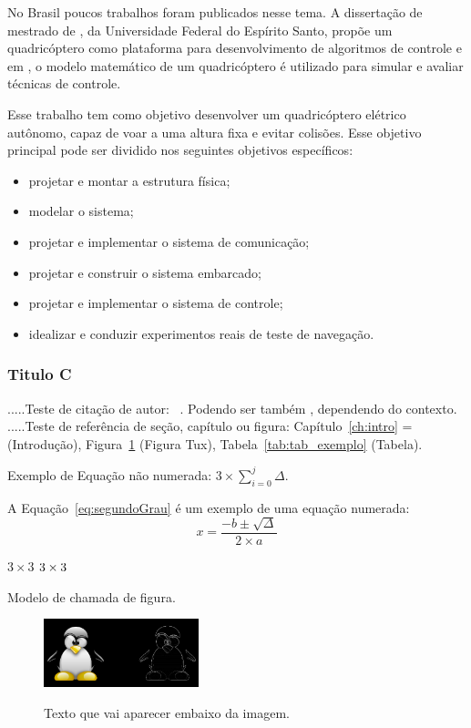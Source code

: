 No Brasil poucos trabalhos foram publicados nesse tema. A dissertação de mestrado de , da Universidade Federal do Espírito Santo, propõe um quadricóptero como plataforma para desenvolvimento de algoritmos de controle e em , o modelo matemático de um quadricóptero é utilizado para simular e avaliar técnicas de controle.

Esse trabalho tem como objetivo desenvolver um quadricóptero elétrico autônomo, capaz de voar a uma altura fixa e evitar colisões. Esse objetivo principal pode ser dividido nos seguintes objetivos específicos:

\begin{itemize}
\item projetar e montar a estrutura física;
\item modelar o sistema;
\item projetar e implementar o sistema de comunicação;
\item projetar e construir o sistema embarcado;
\item projetar e implementar o sistema de controle;
\item idealizar e conduzir experimentos reais de teste de navegação.
\end{itemize}



\subsubsection{Titulo C}\label{ssubsec:tituloc}

.....Teste de citaç\~ao de autor: ~\cite{AikesJunior2011}. Podendo ser também , dependendo do contexto.
.....Teste de referência de seç\~ao, cap\'itulo ou figura: Capítulo~\ref{ch:intro} = (Introduç\~ao), Figura~\ref{fig:tux_laplace} (Figura Tux), Tabela~\ref{tab:tab_exemplo} (Tabela).

Exemplo de Equação não numerada: $3 \times \sum_{i=0}^{j}\Delta$.

A Equação~\ref{eq:segundoGrau} é um exemplo de uma equação numerada:
\begin{equation}
x = \dfrac{-b \pm \sqrt{ \Delta}}{2 \times a}
\label{eq:segundoGrau}
\end{equation}


$3 \times 3$
$\boldmath{ 3 \times 3}$

Modelo de chamada de figura.

\begin{figure}[htb]
	\centering
	\includegraphics[width=0.4\textwidth]{Imagens/tux_laplace.png} %
	\caption[Texto que vai aparecer na lista de fig.]{Texto que vai aparecer embaixo da imagem.}
	\label{fig:tux_laplace}
\end{figure}

